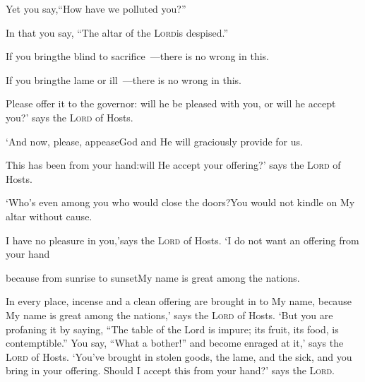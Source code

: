 \begin{inparaenum}
  \pc Yet you say,\pa ``How have we polluted you?''%
  
  \pc In that you say,%
  ``The altar of the \textsc{Lord}\pa is despised.''%
  
  \pb {} If you bring\pa the blind to sacrifice~---\pa there is no wrong in this.%
  
  \pc If you bring\pa the lame or ill~---\pa there is no wrong in this.%
  
  \pc Please offer it to the governor:%
  \pa will he be pleased with you, or will he accept you?'%
  \pa says the \textsc{Lord} of Hosts.%
  
  \pb {} `And now, please, appease\pa God and He will graciously provide for us.%
  
  \pc This has been from your hand:\pa will He accept your offering?'%
  \pa says the \textsc{Lord} of Hosts.%
  
  \pb {} `Who's even among you who would close the doors?\pa You would not kindle on My altar without cause.%
  
  \pc I have no pleasure in you,'\pa says the \textsc{Lord} of Hosts.%
  \pa `I do not want an offering from your hand%
  
  \pb {}%
  because from sunrise to sunset\pa My name is great among the nations.\smallskip%
  
  \noindent In every place, incense and a clean%
  offering are brought in to My name, because My name is great among the nations,' says the \textsc{Lord} of Hosts.%
   `But you are profaning it by saying, ``The table of the Lord is impure; its fruit, its food, is contemptible.''%
   You say, ``What a bother!'' and become enraged at it,' says the \textsc{Lord} of Hosts. `You've brought in stolen goods, the lame, and the sick, and you bring in your offering. Should I accept this from your hand?' says the \textsc{Lord}.%
  

\end{inparaenum}
